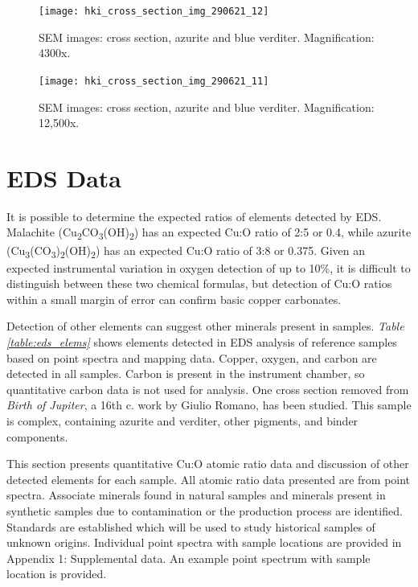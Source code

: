 \begin{figure}[H]
\centering
  \texttt{[image: hki\_cross\_section\_img\_290621\_12]}
\caption[SEM images: cross section, azurite and blue verditer]{SEM images: cross section, azurite and blue verditer. Magnification: 4300x.}
\label{fig:xsection_dept_1}
\end{figure}

\begin{figure}[H]
\centering
  \texttt{[image: hki\_cross\_section\_img\_290621\_11]}
\caption[SEM images: cross section, azurite and blue verditer]{SEM images: cross section, azurite and blue verditer. Magnification: 12,500x.}
\label{fig:xsection_dept_2}
\end{figure}


\section[EDS Data]{EDS Data}
\label{section3.2}

It is possible to determine the expected ratios of elements detected by EDS. Malachite (Cu\textsubscript{2}CO\textsubscript{3}(OH)\textsubscript{2}) has an expected Cu:O ratio of 2:5 or 0.4, while azurite (Cu\textsubscript{3}(CO\textsubscript{3})\textsubscript{2}(OH)\textsubscript{2}) has an expected Cu:O ratio of 3:8 or 0.375. Given an expected instrumental variation in oxygen detection of up to 10\%, it is difficult to distinguish between these two chemical formulas, but detection of Cu:O ratios within a small margin of error can confirm basic copper carbonates.

Detection of other elements can suggest other minerals present in samples. \textit{Table \ref{table:eds_elems}} shows elements detected in EDS analysis of reference samples based on point spectra and mapping data. Copper, oxygen, and carbon are detected in all samples. Carbon is present in the instrument chamber, so quantitative carbon data is not used for analysis. One cross section removed from \textit{Birth of Jupiter}, a 16th c. work by Giulio Romano, has been studied. This sample is complex, containing azurite and verditer, other pigments, and binder components.

This section presents quantitative Cu:O atomic ratio data and discussion of other detected elements for each sample. All atomic ratio data presented are from point spectra. Associate minerals found in natural samples and minerals present in synthetic samples due to contamination or the production process are identified. Standards are established which will be used to study historical samples of unknown origins. Individual point spectra with sample locations are provided in Appendix 1: Supplemental data. An example point spectrum with sample location is provided.

